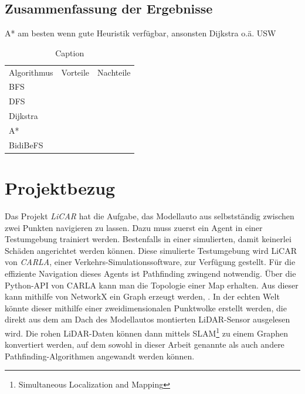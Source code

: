         \subsection{Zusammenfassung der Ergebnisse}

            A* am besten wenn gute Heuristik verfügbar, ansonsten Dijkstra o.ä.
            USW %
            
            \begin{table}
                \centering
                \begin{tabular}{l|c|c}
                    Algorithmus & Vorteile & Nachteile\\
                    BFS &  &\\
                    DFS &  &\\
                    Dijkstra &  &\\
                    A* &  &\\
                    BidiBeFS &  &\\
                \end{tabular}
                \caption{Caption}
                \label{tab:pros-cons}
            \end{table}
    
    \section{Projektbezug}

        Das Projekt \emph{LiCAR} hat die Aufgabe, das Modellauto aus  selbstständig zwischen zwei Punkten navigieren zu lassen. Dazu muss zuerst ein Agent in einer Testumgebung trainiert werden. Bestenfalls in einer simulierten, damit keinerlei Schäden angerichtet werden können. Diese simulierte Testumgebung wird LiCAR von \emph{CARLA}, einer Verkehrs-Simulationssoftware, zur Verfügung gestellt. Für die effiziente Navigation dieses Agents ist Pathfinding zwingend notwendig. Über die Python-API von CARLA kann man die Topologie einer Map erhalten. Aus dieser kann mithilfe von NetworkX ein Graph erzeugt werden, . In der echten Welt könnte dieser mithilfe einer zweidimensionalen Punktwolke erstellt werden, die direkt aus dem am Dach des Modellautos montierten LiDAR-Sensor ausgelesen wird. Die rohen LiDAR-Daten können dann \zb mittels SLAM\footnote{Simultaneous Localization and Mapping} zu einem Graphen konvertiert werden, auf dem sowohl in dieser Arbeit genannte als auch andere Pathfinding-Algorithmen angewandt werden können.

